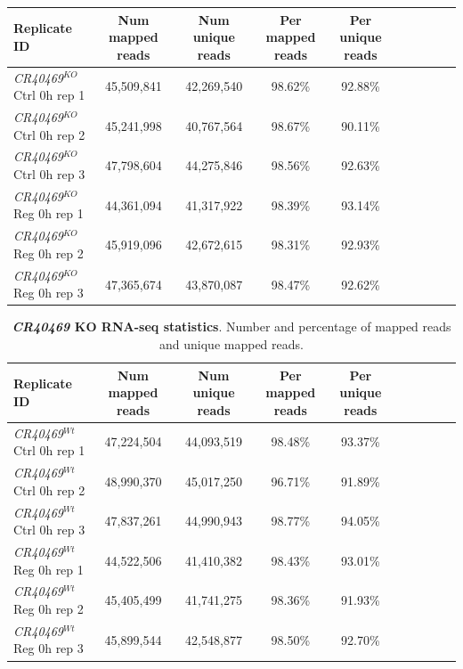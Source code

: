 \begin{table}[!htb]
  \begin{tabulary}{1.0\textwidth}{lCCCCCCCCC}
    \textbf{Replicate ID} & \textbf{Num mapped reads} & \textbf{Num unique reads} & \textbf{Per mapped reads} & \textbf{Per unique reads} \\ \hline
    \textit{CR40469$^{KO}$} Ctrl 0h rep 1 & 45,509,841 & 42,269,540 & 98.62\% & 92.88\% \\
    \textit{CR40469$^{KO}$} Ctrl 0h rep 2 & 45,241,998 & 40,767,564 & 98.67\% & 90.11\% \\
    \textit{CR40469$^{KO}$} Ctrl 0h rep 3 & 47,798,604 & 44,275,846 & 98.56\% & 92.63\% \\
    \textit{CR40469$^{KO}$} Reg 0h rep 1 & 44,361,094 & 41,317,922 & 98.39\% & 93.14\% \\
    \textit{CR40469$^{KO}$} Reg 0h rep 2 & 45,919,096 & 42,672,615 & 98.31\% & 92.93\% \\
    \textit{CR40469$^{KO}$} Reg 0h rep 3 & 47,365,674 & 43,870,087 & 98.47\% & 92.62\% \\
  \end{tabulary}
  \label{supp-tab:cr40469-num-reads-part1}
\end{table}

\begin{table}[!htb]
  \caption[\textit{CR40469} KO RNA-seq statistics]{\textbf{\textit{CR40469} KO RNA-seq statistics}. Number and percentage of mapped reads and unique mapped reads.}
  \begin{tabulary}{1.0\textwidth}{lCCCCCCCCC}
    \textbf{Replicate ID} & \textbf{Num mapped reads} & \textbf{Num unique reads} & \textbf{Per mapped reads} & \textbf{Per unique reads} \\ \hline
    \textit{CR40469$^{Wt}$} Ctrl 0h rep 1 & 47,224,504 & 44,093,519 & 98.48\% & 93.37\% \\
    \textit{CR40469$^{Wt}$} Ctrl 0h rep 2 & 48,990,370 & 45,017,250 & 96.71\% & 91.89\% \\
    \textit{CR40469$^{Wt}$} Ctrl 0h rep 3 & 47,837,261 & 44,990,943 & 98.77\% & 94.05\% \\
    \textit{CR40469$^{Wt}$} Reg 0h rep 1 & 44,522,506 & 41,410,382 & 98.43\% & 93.01\% \\
    \textit{CR40469$^{Wt}$} Reg 0h rep 2 & 45,405,499 & 41,741,275 & 98.36\% & 91.93\% \\
    \textit{CR40469$^{Wt}$} Reg 0h rep 3 & 45,899,544 & 42,548,877 & 98.50\% & 92.70\% \\
  \end{tabulary}
  \label{supp-tab:cr40469-num-reads}
\end{table}

